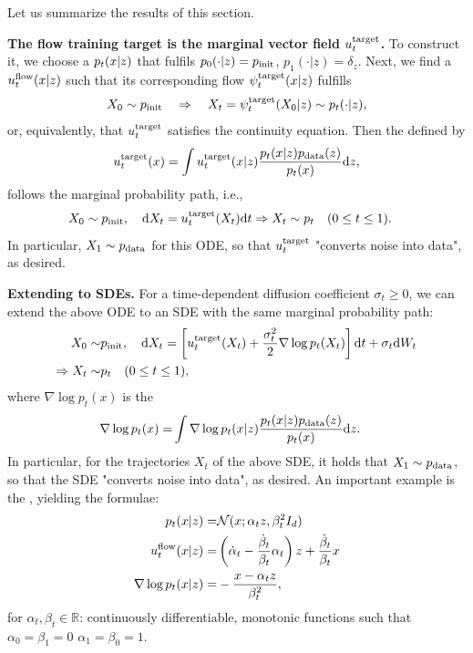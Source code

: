 Let us summarize the results of this section.
\begin{summarybox}
\textbf{The flow training target is the marginal vector field $u^{\text{target}}_t$.} To construct it, we choose a  $p_t(x|z)$ that fulfils $p_0(\cdot|z)=p_{\rm{init}}$, $p_1(\cdot|z)=\delta_{z}$. Next, we find a  $u^{\text{flow}}_t(x|z)$ such that its corresponding flow $\psi^{\text{target}}_t(x|z)$ fulfills
\begin{align*}
    X_0\sim p_{\rm{init}} \quad \Rightarrow \quad X_t = \psi^{\text{target}}_t(X_0|z) \sim p_t(\cdot|z),
\end{align*}
or, equivalently, that $u^{\text{target}}_t$ satisfies the continuity equation.  Then the  defined by
\begin{align}
    \label{eq:marginal_vector_field_restated}
    u^{\text{target}}_t(x) = \int u^{\text{target}}_t(x|z)\frac{p_t(x|z)p_{\rm{data}}(z)}{p_t(x)}\mathrm{d} z,
\end{align}
follows the marginal probability path, i.e.,
\begin{align}
    \label{eq:marginal_ode_follows_marginal_path_restated}
    X_0&\sim p_{\rm{init}},\quad \mathrm{d} X_t =u^{\text{target}}_t(X_t)\mathrm{d} t\Rightarrow X_t\sim p_t\quad (0\leq t\leq 1).
\end{align}
In particular, $X_1\sim p_{\rm{data}}$ for this ODE, so that $u^{\text{target}}_t$ "converts noise into data", as desired.


\textbf{Extending to SDEs.} For a time-dependent diffusion coefficient $\sigma_t\geq 0$, we can extend the above ODE to an SDE with the same marginal probability path:
\begin{align}
\label{eq:sde_extension_restated}
    X_0\sim&p_{\rm{init}},\quad \mathrm{d} X_t =\left[u^{\text{target}}_t(X_t)+\frac{\sigma_t^2}{2}\nabla\log p_t(X_t)\right]\mathrm{d} t +\sigma_t\mathrm{d} W_t\\
    \label{eq:marginal_ode_follows_marginal_path_restated}
    \Rightarrow X_t\sim& p_t\quad (0\leq t\leq 1),
\end{align}
where $\nabla\log p_t(x)$ is the 
\begin{align}
\nabla\log p_t(x) =&\int \nabla \log p_t(x|z)\frac{ p_t(x|z)p_{\rm{data}}(z)}{p_t(x)}\mathrm{d} z.
\end{align}
In particular, for the trajectories $X_t$ of the above SDE, it holds that $X_1\sim p_{\rm{data}}$, so that the SDE "converts noise into data", as desired. An important example is the , yielding the formulae:
\begin{align}
p_t(x|z) =& \mathcal{N}(x;\alpha_t z,\beta_t^2 I_d)\\
u^{\text{flow}}_t(x|z)=&\left(\dot{\alpha}_t-\frac{\dot{\beta}_t}{\beta_t}\alpha_t\right)z+\frac{\dot{\beta}_t}{\beta_t}x\\
\nabla \log p_t(x|z) =& -\frac{x-\alpha_t z}{\beta_t^2},
\end{align}
for  $\alpha_t,\beta_t\in\mathbb{R}$: continuously differentiable, monotonic functions such that $\alpha_0=\beta_1=0$ $\alpha_1=\beta_0=1$.
\end{summarybox}

